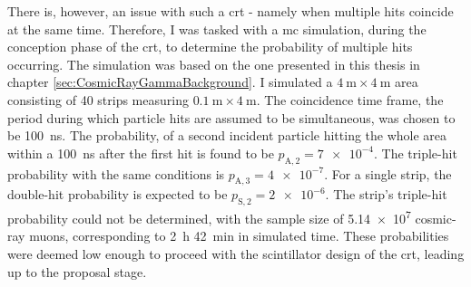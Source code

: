 There is, however, an issue with such a \gls{crt} - namely when multiple hits coincide at the same time. Therefore, I was tasked with a \gls{mc} simulation, during the conception phase of the \gls{crt}, to determine the probability of multiple hits occurring. The simulation was based on the one presented in this thesis in chapter \ref{sec:CosmicRayGammaBackground}. I simulated a $\SI{4}{\metre} \times \SI{4}{\metre}$ area consisting of \num{40} strips measuring $\SI{0.1}{\metre}\times\SI{4}{\metre}$. The coincidence time frame, \ie the period during which particle hits are assumed to be simultaneous, was chosen to be \SI{100}{\nano\second}. The probability, of a second incident particle hitting the whole area within a \SI{100}{\nano\second} after the first hit is found to be $p_{\text{A},2} = \num{7e-4}$. The triple-hit probability with the same conditions is $p_{\text{A},3} = \num{4e-7}$. For a single strip, the double-hit probability is expected to be $p_{\text{S},2} = \num{2e-6}$. The strip's triple-hit probability could not be determined, with the sample size of \num{5.14e7} cosmic-ray muons, corresponding to \SI{2}{\hour} \SI{42}{\minute} in simulated time. These probabilities were deemed low enough to proceed with the scintillator design of the \gls{crt}, leading up to the proposal stage.

